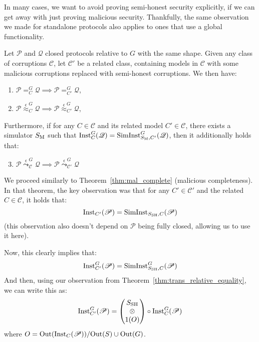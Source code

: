 In many cases, we want to avoid proving semi-honest security
explicitly, if we can get away with just proving malicious security.
Thankfully, the same observation we made for standalone protocols
also applies to ones that use a global functionality.

\begin{theorem}
  Let $\mathscr{P}$ and $\mathscr{Q}$ closed protocols relative to $G$ with the same shape.
  Given any class of corruptions $\mathscr{C}$, let $\mathscr{C}'$ be a related class, containing
  models in $\mathscr{C}$ with some
  malicious corruptions replaced with semi-honest corruptions.
  We then have:
  \begin{enumerate}
    \item $\mathscr{P} =^G_{C} \mathscr{Q} \implies \mathscr{P} =^G_{C'} \mathscr{Q}$,
    \item $\mathscr{P} \overset{\epsilon}{\approx}^G_{C} \mathscr{Q} \implies \mathscr{P} \overset{\epsilon}{\approx}^G_{C'} \mathscr{Q}$,
  \end{enumerate}

  Furthermore, if for any $C \in \mathscr{C}$ and its related model $C' \in \mathscr{C}$,
  there exists a simulator $S_{\text{M}}$ such that $\text{Inst}^G_C(\mathscr{Q}) = \text{SimInst}^G_{S_{\text{M}}, C'}(\mathscr{Q})$,
  then it additionally holds that:
  \begin{enumerate}
    \setcounter{enumi}{2}
    \item $\mathscr{P} \overset{\epsilon}{\leadsto}^G_{\mathscr{C}} \mathscr{Q} \implies \mathscr{P} \overset{\epsilon}{\leadsto}^G_{\mathscr{C}'} \mathscr{Q}$
  \end{enumerate}

   We proceed similarly to Theorem~\ref{thm:mal_complete} (malicious completeness).
  In that theorem, the key observation was that for any $C' \in \mathscr{C}'$
  and the related $C \in \mathscr{C}$, it holds that:
  $$
  \text{Inst}_{C'}(\mathscr{P}) = \text{SimInst}_{S_{\text{SH}}, C}(\mathscr{P})
  $$
  (this observation also doesn't depend on $\mathscr{P}$ being fully closed,
  allowing us to use it here).

  Now, this clearly implies that:
  $$
  \text{Inst}_{C'}^G(\mathscr{P}) = \text{SimInst}^G_{S_{\text{SH}}, C}(\mathscr{P})
  $$
  And then, using our observation from Theorem~\ref{thm:trans_relative_equality},
  we can write this as:
  $$
  \text{Inst}_{C'}^G(\mathscr{P}) =
  \begin{pmatrix}
    S_{\text{SH}}\cr
    \otimes\cr
    1(O)
  \end{pmatrix}
  \circ
  \text{Inst}^G_C(\mathscr{P})
  $$
  where $O = \text{Out}(\text{Inst}_C(\mathscr{P})) / \text{Out}(S) \cup \text{Out}(G)$.


\end{theorem}
